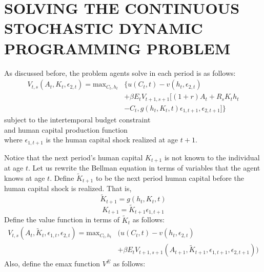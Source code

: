 \documentclass[\econtexRoot/ImaiKeane]{subfiles}
\begin{document}
\section{SOLVING THE CONTINUOUS STOCHASTIC DYNAMIC PROGRAMMING PROBLEM}
\label{section:solving}
As discussed before, the problem agents solve in each period is as follows:
\begin{equation} \tag{5'}
  \begin{split}
      V_{t,s}(A_t,K_t,\epsilon_{2,t})=\text{max}_{C_t,h_t} & \{u(C_t,t)-v(h_t, \epsilon_{2,t}) \\ & + \beta E_t V_{t+1,s+1}[(1+r)A_t + R_s K_t h_t \\ & -C_t, g(h_t,K_t,t)\epsilon_{1,t+1}, \epsilon_{2,t+1}]\}
  \end{split}
\end{equation}
subject to the intertemporal budget constraint
\begin{equation} \tag{2}
  \label{eq:bc}
 
\end{equation}
and human capital production function
\begin{equation} \tag{4}

\end{equation}
where $\epsilon_{1,t+1}$ is the human capital shock realized at age $t+1$.\par
Notice that the next period's human capital $K_{t+1}$ is not known to the individual at age $t$. Let us rewrite the Bellman equation in terms of variables that the agent knows at age $t$. Define $\tilde{K}_{t+1}$ to be the next period human capital before the human capital shock is realized. That is,
\begin{equation*}
  \tilde{K}_{t+1} = g(h_t, K_t,t)
\end{equation*}
\begin{equation*}
  K_{t+1} =  \tilde{K}_{t+1} \epsilon_{1,t+1}
\end{equation*}
Define the value function in terms of $ \tilde{K}_t$ as follows:
\begin{equation*}
  \begin{split}
      V_{t,s}(A_t,\tilde{K}_t,\epsilon_{1,t},\epsilon_{2,t})=\text{max}_{C_t,h_t} & (u(C_t,t)-v(h_t, \epsilon_{2,t}) \\ & + \beta E_t V_{t+1,s+1} (A_{t+1},\tilde{K}_{t+1},\epsilon_{1,t+1},\epsilon_{2,t+1}))
  \end{split}
\end{equation*}
Also, define the emax function $V^E$ as follows:
\begin{equation*}

\end{equation*}
\end{document}
